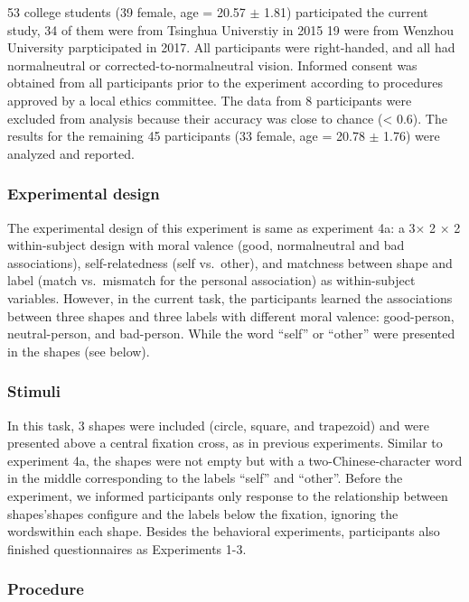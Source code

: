 \documentclass[man]{apa6}
\begin{document}
53 college students (39 female, age = 20.57 \(\pm\) 1.81) participated the current study, 34 of them were from Tsinghua Universtiy in 2015 19 were from Wenzhou University parpticipated in 2017. All participants were right-handed, and all had normalneutral or corrected-to-normalneutral vision. Informed consent was obtained from all participants prior to the experiment according to procedures approved by a local ethics committee. The data from 8 participants were excluded from analysis because their accuracy was close to chance (\textless{} 0.6). The results for the remaining 45 participants (33 female, age = 20.78 \(\pm\) 1.76) were analyzed and reported.

\hypertarget{experimental-design-1}{%
\subsubsection{Experimental design}\label{experimental-design-1}}

The experimental design of this experiment is same as experiment 4a: a 3× 2 × 2 within-subject design with moral valence (good, normalneutral and bad associations), self-relatedness (self vs.~other), and matchness between shape and label (match vs.~mismatch for the personal association) as within-subject variables. However, in the current task, the participants learned the associations between three shapes and three labels with different moral valence: good-person, neutral-person, and bad-person. While the word \enquote{self} or \enquote{other} were presented in the shapes (see below).

\hypertarget{stimuli-2}{%
\subsubsection{Stimuli}\label{stimuli-2}}

In this task, 3 shapes were included (circle, square, and trapezoid) and were presented above a central fixation cross, as in previous experiments. Similar to experiment 4a, the shapes were not empty but with a two-Chinese-character word in the middle corresponding to the labels \enquote{self} and \enquote{other}. Before the experiment, we informed participants only response to the relationship between shapes'shapes configure and the labels below the fixation, ignoring the wordswithin each shape. Besides the behavioral experiments, participants also finished questionnaires as Experiments 1-3.

\hypertarget{procedure-7}{%
\subsubsection{Procedure}\label{procedure-7}}
\end{document}
